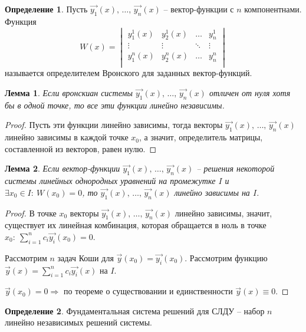 \documentclass[a4paper,12pt]{article}
\theoremstyle{plain}
\newtheorem{lemma}{Лемма}[section]
\theoremstyle{definition}
\newtheorem{definition}{Определение}[section]
\theoremstyle{remark}
\begin{document}
\begin{definition}
	Пусть $\vec{y_1}(x),\,\ldots,\,\vec{y_n}(x)$ -- вектор-функции с $n$ компонентнами. Функция
	\[W(x) = \begin{vmatrix}
			y_1^1(x) & y_2^1(x) & \ldots & y_n^1  \\
			\vdots   & \vdots   & \ddots & \vdots \\
			y_1^n(x) & y_2^n(x) & \ldots & y_n^n  \\
		\end{vmatrix}\]
	называется определителем Вронского для заданных вектор-функций.
\end{definition}

\begin{lemma}
	Если вронскиан системы $\vec{y_1}(x),\,\ldots,\,\vec{y_n}(x)$ отличен от нуля хотя бы в одной точке, то все эти функции линейно независимы.
\end{lemma}

\begin{proof}
	Пусть эти функции линейно зависимы, тогда векторы $\vec{y_1}(x),\,\ldots,\,\vec{y_n}(x)$ линейно зависимы в каждой точке $x_0$, а значит, определитель матрицы, составленной из векторов, равен нулю.
\end{proof}

\begin{lemma}
	Если вектор-функции $\vec{y_1}(x),\,\ldots,\,\vec{y_n}(x)$ -- решения некоторой системы линейных однородных уравнений на промежутке $I$ и $\exists x_0 \in I:\: W(x_0) = 0$, то $\vec{y_1}(x),\,\ldots,\,\vec{y_n}(x)$ линейно зависимы на $I$.
\end{lemma}

\begin{proof}
	В точке $x_0$ векторы $\vec{y_1}(x),\,\ldots,\,\vec{y_n}(x)$ линейно зависимы, значит, существует их линейная комбинация, которая обращается в ноль в точке $x_0:\: \sum\limits_{i = 1}^n c_i\vec{y_i}(x_0) = 0$.

	Рассмотрим $n$ задач Коши для $\vec{y}(x_0) = \vec{y_i}(x_0)$. Рассмотрим функцию $\vec{y}(x) = \sum\limits_{i = 1}^n c_i \vec{y_i}(x)$ на $I$.

	$\vec{y}(x_0) = 0 \Rightarrow$ по теореме о существовании и единственности $\vec{y}(x) \equiv 0$.
\end{proof}

\begin{definition}
	Фундаментальная система решений для СЛДУ -- набор $n$ линейно независимых решений системы.
\end{definition}
\end{document}
